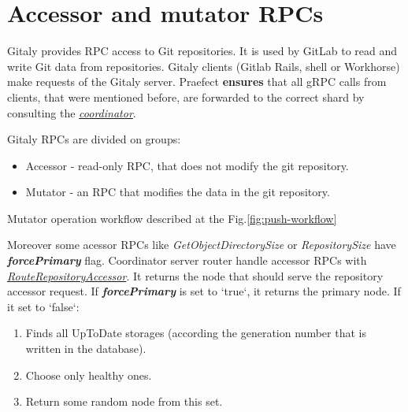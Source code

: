 \documentclass[acmlarge, screen, nonacm]{acmart}
\begin{document}
\section{Accessor and mutator RPCs}
Gitaly provides RPC access to Git repositories. It is used by GitLab to read and write Git data from repositories.
Gitaly clients (Gitlab Rails, shell or Workhorse) make requests of the Gitaly server.  Praefect \textbf{ensures} 
that all gRPC calls from clients, that were mentioned before, are forwarded to the correct shard by consulting the
\emph{\href{https://gitlab.com/gitlab-org/gitaly/-/blob/master/internal/praefect/coordinator.go}{coordinator}}.

Gitaly RPCs are divided on groups:
\begin{itemize}
\item Accessor - read-only RPC, that does not modify the git repository.
\item Mutator - an RPC that modifies the data in the git repository.
\end{itemize}

Mutator operation workflow described at the Fig.\ref{fig:push-workflow}

Moreover some acessor RPCs like \textit{GetObjectDirectorySize} or \textit{RepositorySize} have \textbf{\textit{forcePrimary}} flag. 
Coordinator server router handle accessor RPCs with  
\emph{\href{https://gitlab.com/gitlab-org/gitaly/-/blob/master/internal/praefect/coordinator.go\#L356}{ RouteRepositoryAccessor}}. 
It returns the node that should serve the repository accessor request. If \textbf{\textit{forcePrimary }} is set to `true`, it returns the primary node. 
If it set to `false`: 
\begin{enumerate}
\item Finds all UpToDate storages (according the generation number that is written in the database).
\item Choose only healthy ones.
\item Return some random node from this set.
\end{enumerate}
\end{document}

